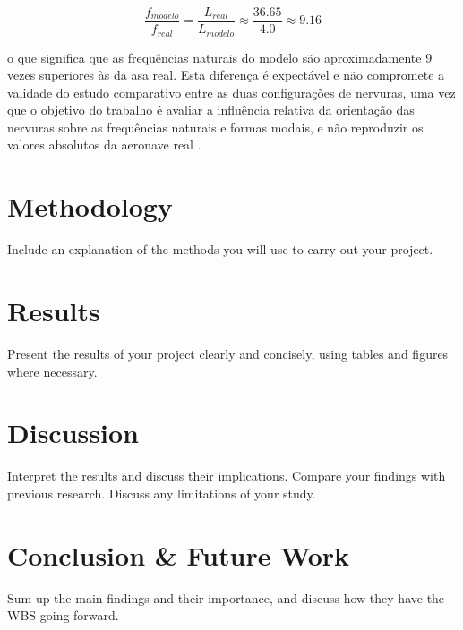 \documentclass[11pt,twoside,a4paper]{report}
\begin{document}
\begin{equation}
    \frac{f_{modelo}}{f_{real}} = \frac{L_{real}}{L_{modelo}} 
    \approx \frac{36.65}{4.0} \approx 9.16
    \label{eq:escala_freq}
\end{equation}

\noindent o que significa que as frequências naturais do modelo são aproximadamente 9 vezes superiores às da asa real. Esta diferença é expectável e não compromete a validade do estudo comparativo entre as duas configurações de nervuras, uma vez que o objetivo do trabalho é avaliar a influência relativa da orientação das nervuras sobre as frequências naturais e formas modais, e não reproduzir os valores absolutos da aeronave real \cite{Dowell2004}.




\chapter{Methodology}
Include an explanation of the methods you will use to carry out your project.
\chapter{Results}
Present the results of your project clearly and concisely, using tables and figures where necessary.
\chapter{Discussion}
Interpret the results and discuss their implications.
Compare your findings with previous research.
Discuss any limitations of your study.
\chapter{Conclusion \& Future Work}
Sum up the main findings and their importance, and discuss how they have the WBS going forward.




\end{document}
